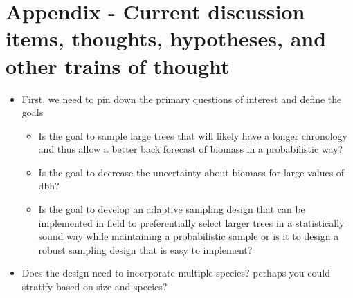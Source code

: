 \documentclass[fleqn]{article}
\begin{document}
\section{Appendix - Current discussion items, thoughts, hypotheses, and other trains of thought}
  \begin{itemize}
    \item First, we need to pin down the primary questions of interest and define the goals
    \begin{itemize}
      \item Is the goal to sample large trees that will likely have a longer chronology and thus allow a better back forecast of biomass in a probabilistic way?
      \item Is the goal to decrease the uncertainty about biomass for large values of dbh?
      \item Is the goal to develop an adaptive sampling design that can be implemented in field to preferentially select larger trees in a statistically sound way while maintaining a probabilistic sample or is it to design a robust sampling design that is easy to implement?
    \end{itemize}
  \item Does the design need to incorporate multiple species? perhaps you could stratify based on size and species?
\end{itemize}
%
\end{document}
